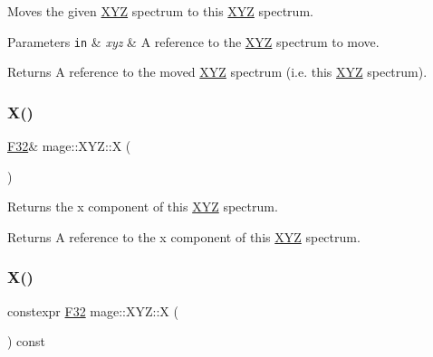Moves the given \mbox{\hyperlink{structmage_1_1_x_y_z}{X\+YZ}} spectrum to this \mbox{\hyperlink{structmage_1_1_x_y_z}{X\+YZ}} spectrum.


\begin{DoxyParams}[1]{Parameters}
\mbox{\tt in}  & {\em xyz} & A reference to the \mbox{\hyperlink{structmage_1_1_x_y_z}{X\+YZ}} spectrum to move. \\
\hline
\end{DoxyParams}
\begin{DoxyReturn}{Returns}
A reference to the moved \mbox{\hyperlink{structmage_1_1_x_y_z}{X\+YZ}} spectrum (i.\+e. this \mbox{\hyperlink{structmage_1_1_x_y_z}{X\+YZ}} spectrum). 
\end{DoxyReturn}
\mbox{\label{structmage_1_1_x_y_z_a13f2b286fbf7330f0228844e56cff9ff}} 
\subsubsection{\texorpdfstring{X()}{X()}\hspace{0.1cm}{\footnotesize\ttfamily [1/2]}}
{\footnotesize\ttfamily \mbox{\hyperlink{namespacemage_aa97e833b45f06d60a0a9c4fc22ae02c0}{F32}}\& mage\+::\+X\+Y\+Z\+::X (\begin{DoxyParamCaption}{ }\end{DoxyParamCaption})\hspace{0.3cm}{\ttfamily [noexcept]}}

Returns the x component of this \mbox{\hyperlink{structmage_1_1_x_y_z}{X\+YZ}} spectrum.

\begin{DoxyReturn}{Returns}
A reference to the x component of this \mbox{\hyperlink{structmage_1_1_x_y_z}{X\+YZ}} spectrum. 
\end{DoxyReturn}
\mbox{\label{structmage_1_1_x_y_z_ab6e2fb7de212056b6f36a33d5672bc57}} 
\subsubsection{\texorpdfstring{X()}{X()}\hspace{0.1cm}{\footnotesize\ttfamily [2/2]}}
{\footnotesize\ttfamily constexpr \mbox{\hyperlink{namespacemage_aa97e833b45f06d60a0a9c4fc22ae02c0}{F32}} mage\+::\+X\+Y\+Z\+::X (\begin{DoxyParamCaption}{ }\end{DoxyParamCaption}) const\hspace{0.3cm}{\ttfamily [noexcept]}}

